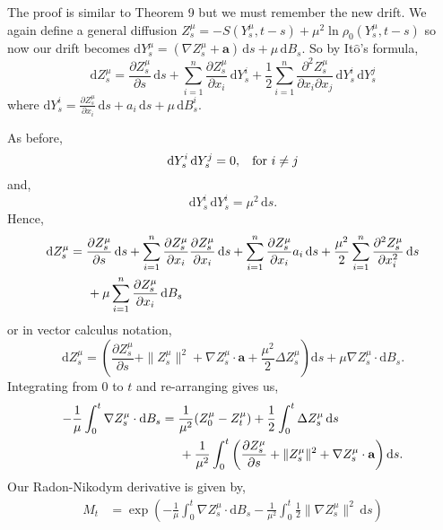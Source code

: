 \documentclass[a4paper,12pt,draft]{report}
\begin{document}
{
The proof is similar to Theorem 9 but we must remember the new drift.  We again define a general diffusion $Z_s^\mu = -S(Y_s^\mu, t - s) + \mu^2\ln\rho_0(Y_s^\mu, t - s)$ so now our drift becomes $\mathrm{d}Y_s^\mu = (\nabla Z_s^\mu + \mathbf{a})\,\mathrm{d}s + \mu\,\mathrm{d}B_s$.  So by It$\mathrm{\hat{o}}$'s formula,
$$
\mathrm{d}Z_s^\mu = \frac{\partial Z_s^\mu}{\partial s}\,\mathrm{d}s + \sum_{i = 1}^n\frac{\partial Z_s^\mu}{\partial x_i}\,\mathrm{d}Y_s^i + \frac{1}{2}\sum_{i = 1}^n\frac{\partial^2 Z_s^\mu}{\partial x_i \partial x_j}\,\mathrm{d}Y_s^i\,\mathrm{d}Y_s^j
$$
where $\mathrm{d}Y_s^i = \frac{\partial Z_s^\mu}{\partial x_i}\,\mathrm{d}s + a_i\,\mathrm{d}s + \mu\,\mathrm{d}B_s^i$.

As before,
$$
\mathrm{d}Y_s^i\,\mathrm{d}Y_s^j = 0, \hspace{0.3cm} \text{for } i \ne j
$$
and,
$$
\mathrm{d}Y_s^i\,\mathrm{d}Y_s^i = \mu^2\,\mathrm{d}s.
$$
Hence,
\begin{align}
\mathrm{d}Z_s^\mu & = \frac{\partial Z_s^\mu}{\partial s}\,\mathrm{d}s + \sum_{i = 1}^n\frac{\partial Z_s^\mu}{\partial x_i}\frac{\partial Z_s^\mu}{\partial x_i}\,\mathrm{d}s + \sum_{i = 1}^n\frac{\partial Z_s^\mu}{\partial x_i}a_i\,\mathrm{d}s + \frac{\mu^2}{2}\sum_{i = 1}^n\frac{\partial^2Z_s^\mu}{\partial x_i^2}\,\mathrm{d}s\nonumber\\
& \hspace{0.5cm} + \mu\sum_{i = 1}^n\frac{\partial Z_s^\mu}{\partial x_i}\,\mathrm{d}B_s\nonumber
\end{align}
or in vector calculus notation,
$$
\mathrm{d}Z_s^\mu = \left(\frac{\partial Z_s^\mu}{\partial s} + \|Z_s^\mu\|^2 + \nabla Z_s^\mu\cdot\mathbf{a} + \frac{\mu^2}{2}\Delta Z_s^\mu\right)\mathrm{d}s + \mu\nabla Z_s^\mu\cdot\mathrm{d}B_s.
$$
Integrating from $0$ to $t$ and re-arranging gives us,
\begin{align}
-\frac{1}{\mu}\int_0^t\nabla Z_s^\mu\cdot\mathrm{d}B_s & = \frac{1}{\mu^2}(Z_0^\mu - Z_t^\mu) + \frac{1}{2}\int_0^t\Delta Z_s^\mu\,\mathrm{d}s\nonumber\\
& \hspace{0.5cm} + \frac{1}{\mu^2}\int_0^t\left(\frac{\partial Z_s^\mu}{\partial s} + \|Z_s^\mu\|^2 + \nabla Z_s^\mu\cdot\mathbf{a}\right)\mathrm{d}s.\nonumber
\end{align}
Our Radon-Nikodym derivative is given by,
\begin{align}
M_t & = \exp\left(-\frac{1}{\mu}\int_0^t\nabla Z_s^\mu\cdot\mathrm{d}B_s - \frac{1}{\mu^2}\int_0^t\frac{1}{2}\|\nabla Z_s^\mu\|^2\,\mathrm{d}s\right)\nonumber\\

\end{align}}
\end{document}
